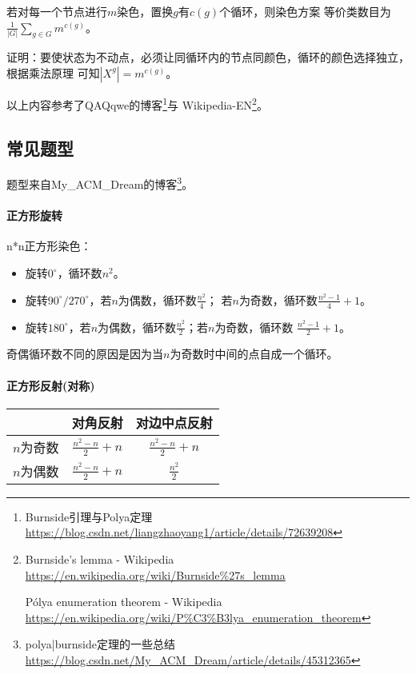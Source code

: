 \begin{theorem}
	若对每一个节点进行$m$染色，置换$g$有$c(g)$个循环，则染色方案
	等价类数目为$\displaystyle \frac{1}{|G|}\sum_{g\in G}m^{c(g)}$。
\end{theorem}

证明：要使状态为不动点，必须让同循环内的节点同颜色，循环的颜色选择独立，根据乘法原理
可知$|X^g|=m^{c(g)}$。

以上内容参考了QAQqwe的博客\footnote{Burnside引理与Polya定理
	\url{https://blog.csdn.net/liangzhaoyang1/article/details/72639208}}与
Wikipedia-EN\footnote{
	Burnside's lemma - Wikipedia
	\url{https://en.wikipedia.org/wiki/Burnside\%27s\_lemma}

	Pólya enumeration theorem - Wikipedia
	\url{https://en.wikipedia.org/wiki/P\%C3\%B3lya\_enumeration\_theorem}
}。

\subsection{常见题型}
题型来自My\_ACM\_Dream的博客\footnote{polya|burnside定理的一些总结\\
	\url{https://blog.csdn.net/My\_ACM\_Dream/article/details/45312365}}。

\paragraph{正方形旋转}
n*n正方形染色：
\begin{itemize}
	\item 旋转$0^\circ$，循环数$n^2$。
	\item 旋转$90^\circ/270^\circ$，若$n$为偶数，循环数$\frac{n^2}{4}$；
	      若$n$为奇数，循环数$\frac{n^2-1}{4}+1$。
	\item 旋转$180^\circ$，若$n$为偶数，循环数$\frac{n^2}{2}$；若$n$为奇数，循环数
		  $\frac{n^2-1}{2}+1$。
\end{itemize}
奇偶循环数不同的原因是因为当$n$为奇数时中间的点自成一个循环。
\paragraph{正方形反射(对称)}
\begin{tabular}{|c|c|c|}
	\hline
	          & 对角反射            & 对边中点反射        \\
	\hline
	$n$为奇数 & $\frac{n^2-n}{2}+n$ & $\frac{n^2-n}{2}+n$ \\
	\hline
	$n$为偶数 & $\frac{n^2-n}{2}+n$ & $\frac{n^2}{2}$     \\
	\hline
\end{tabular}
